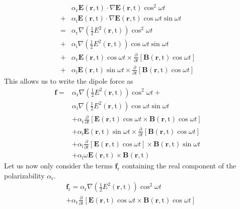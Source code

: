 \begin{align}
&\alpha_{\mathrm{r}}\mathbf{E}(\mathbf{r},\mathrm{t})\cdot\nabla\mathbf{E}(\mathbf{r},\mathrm{t})\cos^2{\omega t}& \nonumber \\
+ &\alpha_{\mathrm{i}}\mathbf{E}(\mathbf{r},\mathrm{t})\cdot\nabla\mathbf{E}(\mathbf{r},\mathrm{t})\cos{\omega t}\sin{\omega t}& \nonumber \\
= &\alpha_{\mathrm{r}}\nabla\left(\frac{1}{2}E^2(\mathbf{r},\mathrm{t})\right)\cos^2{\omega t}& \nonumber \\
+&\alpha_{\mathrm{i}}\nabla\left(\frac{1}{2}E^2(\mathbf{r},\mathrm{t})\right)\cos{\omega t}\sin{\omega t}& \nonumber \\
+&\alpha_{\mathrm{r}}\mathbf{E}(\mathbf{r},\mathrm{t})\cos{\omega t}\times\frac{\partial}{\partial t}\left[\mathbf{B}(\mathbf{r},\mathrm{t})\cos{\omega t}\right]& \nonumber \\
+&\alpha_{\mathrm{i}}\mathbf{E}(\mathbf{r},\mathrm{t})\sin{\omega t}\times\frac{\partial}{\partial t}\left[\mathbf{B}(\mathbf{r},\mathrm{t})\cos{\omega t}\right]&
\end{align}
This allows us to write the dipole force as
\begin{align}
\mathbf{f}=&\alpha_{\mathrm{r}}\nabla\left(\frac{1}{2}E^2(\mathbf{r},\mathrm{t})\right)\cos^2{\omega t}+& \nonumber \\
&\alpha_{\mathrm{i}}\nabla\left(\frac{1}{2}E^2(\mathbf{r},\mathrm{t})\right)\cos{\omega t}\sin{\omega t}& \nonumber \\
& +\alpha_{\mathrm{r}}\frac{\partial}{\partial t}\left[\mathbf{E}(\mathbf{r},\mathrm{t})\cos{\omega t}\times\mathbf{B}(\mathbf{r},\mathrm{t})\cos{\omega t}\right]& \nonumber \\
& +\alpha_{\mathrm{i}}\mathbf{E}(\mathbf{r},\mathrm{t})\sin{\omega t}\times\frac{\partial}{\partial t}\left[\mathbf{B}(\mathbf{r},\mathrm{t})\cos{\omega t}\right]& \nonumber \\
& +\alpha_{\mathrm{i}}\frac{\partial}{\partial t}\left[\mathbf{E}(\mathbf{r},\mathrm{t})\cos{\omega t}\right]\times\mathbf{B}(\mathbf{r},\mathrm{t})\sin{\omega t}& \nonumber \\
& +\alpha_{\mathrm{i}}\omega\mathbf{E}(\mathbf{r},\mathrm{t})\times\mathbf{B}(\mathbf{r},\mathrm{t})&
\end{align}
Let us now only consider the terms $\mathbf{f}_{\mathrm{r}}$ containing the real component of the polarizability $\alpha_{\mathrm{r}}$.  
\begin{align}
&\mathbf{f}_{\mathrm{r}}=\alpha_{\mathrm{r}}\nabla\left(\frac{1}{2}E^2(\mathbf{r},\mathrm{t})\right)\cos^2{\omega t}\\
& +\alpha_{\mathrm{r}}\frac{\partial}{\partial t}\left[\mathbf{E}(\mathbf{r},\mathrm{t})\cos{\omega t}\times\mathbf{B}(\mathbf{r},\mathrm{t})\cos{\omega t}\right]& 
\label{lorentzforceB}
\end{align}
